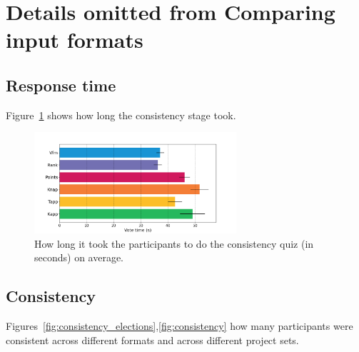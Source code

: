 \documentclass{comsoc2023}
\begin{document}

\section{Details omitted from Comparing input formats}\label{app:comparison}
\subsection{Response time}
Figure~\ref{fig:consistency_time} shows how long the consistency stage took. 

\begin{figure}[!h]
\begin{center}
\includegraphics[width=7.5cm]{experiment/consistency_time.png}
\caption{How long it took the participants to do the consistency quiz (in seconds) on average.
}\label{fig:consistency_time}
\end{center}
\end{figure}


\subsection{Consistency}
Figures~\ref{fig:consistency_elections},\ref{fig:consistency} how many participants were consistent across different formats and across different project sets.%

\end{document}
